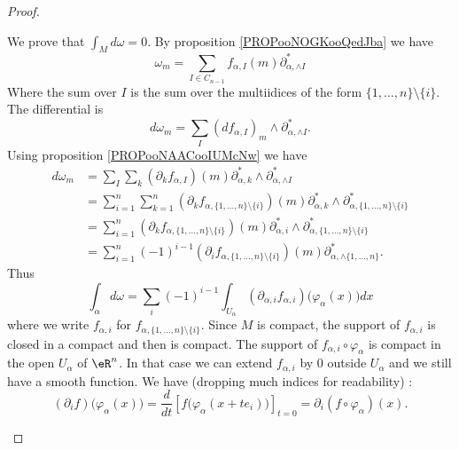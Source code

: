 \begin{proof}
\begin{subproof}
\begin{subproof}
			\spitem[On \( M\)]
			We prove that \( \int_Md\omega=0\). By proposition \ref{PROPooNOGKooQedJba} we have
			\begin{equation}
				\omega_m=\sum_{I\in C_{n-1}}f_{\alpha,I}(m)\partial_{\alpha,\wedge I}^*
			\end{equation}
			Where the sum over \( I\) is the sum over the multiidices of the form \( \{ 1,\ldots,n \}\setminus\{ i \} \). The differential is
			\begin{equation}
				d\omega_m=\sum_I(df_{\alpha,I})_m\wedge\partial^*_{\alpha,\wedge I}.
			\end{equation}
			Using proposition \ref{PROPooNAACooIUMcNw} we have
			\begin{subequations}
				\begin{align}
					d\omega_m & =\sum_I\sum_k(\partial_kf_{\alpha,I})(m)\partial^*_{\alpha,k}\wedge\partial^*_{\alpha,\wedge I}                                                                     \\
					          & =\sum_{i=1}^n\sum_{k=1}^n(\partial_kf_{\alpha,\{ 1,\ldots,n \}\setminus\{ i \}})(m)\partial_{\alpha,k}^*\wedge\partial^*_{\alpha,\{ 1,\ldots,n \}\setminus \{ i \}} \\
					          & =\sum_{i=1}^n(\partial_kf_{\alpha,\{ 1,\ldots,n \}\setminus\{ i \}})(m)\partial_{\alpha,i}^*\wedge\partial^*_{\alpha,\{ 1,\ldots,n \}\setminus \{ i \}}             \\
					          & =\sum_{i=1}^n(-1)^{i-1}(\partial_if_{\alpha,\{ 1,\ldots,n \}\setminus\{ i \}})(m)\partial^*_{\alpha,\wedge\{ 1,\ldots,n \}}.
				\end{align}
			\end{subequations}
			Thus
			\begin{equation}
				\int_{\alpha}d\omega=\sum_i(-1)^{i-1}\int_{U_{\alpha}}(\partial_{\alpha,i}f_{\alpha,i})\big( \varphi_{\alpha}(x) \big)dx
			\end{equation}
			where we write \( f_{\alpha,i}\) for \( f_{\alpha,\{ 1,\ldots,n \}\setminus \{ i \}}\).
			Since \( M\) is compact, the support of \( f_{\alpha,i}\) is closed in a compact and then is compact. The support of \( f_{\alpha,i}\circ\varphi_{\alpha}\) is compact in the open \( U_{\alpha}\) of \( \eR^{n}\). In that case we can extend \( f_{\alpha,i}\) by \( 0\) outside \( U_{\alpha}\) and we still have a smooth function. We have (dropping much indices for readability) :
			\begin{equation}
				(\partial_if)\big( \varphi_{\alpha}(x) \big)=\frac{d}{dt} \left[ f\big( \varphi_{\alpha}(x+te_i) \big)  \right]_{t=0}=\partial_i(f\circ\varphi_{\alpha})(x).

\end{equation}
\end{subproof}
\end{subproof}
\end{proof}
